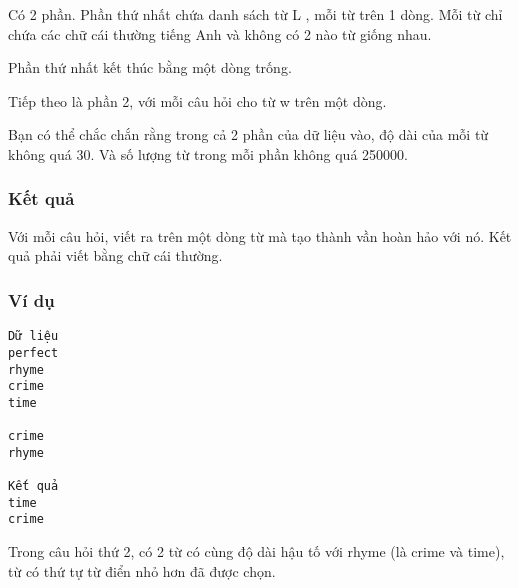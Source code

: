    Có 2 phần. Phần thứ nhất chứa danh sách từ       L      , mỗi từ trên 1 dòng. Mỗi từ chỉ chứa các chữ cái thường tiếng Anh và không có 2 nào từ giống nhau.  

   Phần thứ nhất kết thúc bằng một dòng trống.  

   Tiếp theo là phần 2, với mỗi câu hỏi cho từ       w      trên một dòng.  

   Bạn có thể chắc chắn rằng trong cả 2 phần của dữ liệu vào, độ dài của mỗi từ không quá 30. Và số lượng từ trong mỗi phần không quá 250000.  

\subsubsection{   Kết quả  }

   Với mỗi câu hỏi, viết ra trên một dòng từ mà tạo thành vần hoàn hảo với nó. Kết quả phải viết bằng chữ cái thường.  

\subsubsection{   Ví dụ  }
\begin{verbatim}
Dữ liệu
perfect
rhyme
crime
time

crime
rhyme

Kết quả
time
crime
\end{verbatim}

   Trong câu hỏi thứ 2, có 2 từ có cùng độ dài hậu tố với rhyme (là crime và time), từ có thứ tự từ điển nhỏ hơn đã được chọn.  